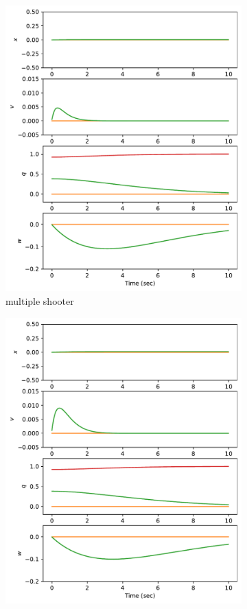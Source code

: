 \documentclass[]{article}
\begin{document}
 
\begin{figure}[H]
	\centering
	\begin{subfigure}[b]{0.3\textwidth}
		\centering
		\includegraphics[width=\textwidth]{figures/state45dz3.pdf}
		\caption{multiple shooter}
	\end{subfigure}
	\begin{subfigure}[b]{0.3\textwidth}
		\centering
		\includegraphics[width=\textwidth]{figures/state45dz1.pdf}

\end{subfigure}
\end{figure}
\end{document}
